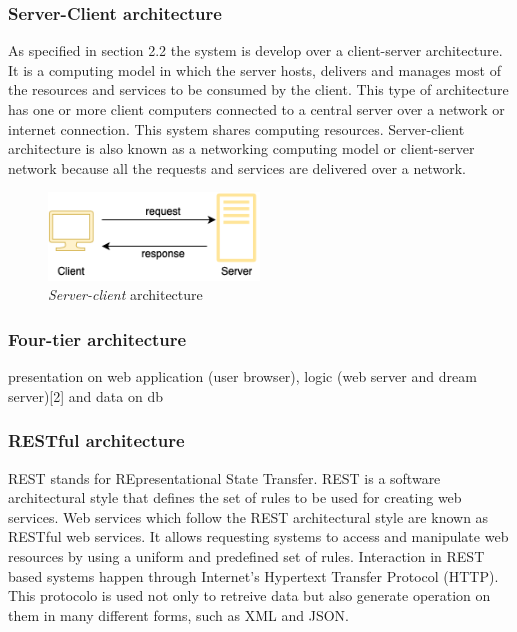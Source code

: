 \subsubsection{Server-Client architecture}
As specified in section 2.2 the system is develop over a client-server architecture. It is a computing model in which the server hosts, delivers and manages most of the resources and services to be consumed by the client. This type of architecture has one or more client computers connected to a central server over a network or internet connection. This system shares computing resources. Server-client architecture is also known as a networking computing model or client-server network because all the requests and services are delivered over a network.
\begin{figure}[H]
    \begin{center}
    \includegraphics[width=0.5\textwidth]{images/client-server.png}
    \caption{\emph{Server-client} architecture}
    \label{fig:client-server}
    \end{center}
\end{figure}

\subsubsection{Four-tier architecture}
presentation on web application (user browser), logic (web server and dream server)[2] and data on db 

\subsubsection{RESTful architecture}
REST stands for REpresentational State Transfer. REST is a software architectural style that defines the set of rules to be used for creating web services. Web services which follow the REST architectural style are known as RESTful web services. It allows requesting systems to access and manipulate web resources by using a uniform and predefined set of rules. Interaction in REST based systems happen through Internet’s Hypertext Transfer Protocol (HTTP). This protocolo is used not only to retreive data but also generate operation on them in many different forms, such as XML and JSON.


